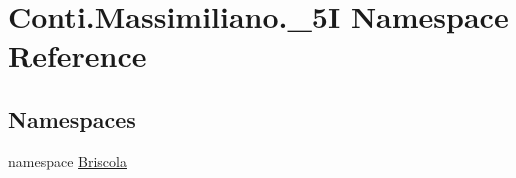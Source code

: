 \hypertarget{namespace_conti_1_1_massimiliano_1_1__5_i}{}\section{Conti.\+Massimiliano.\+\_\+5I Namespace Reference}
\label{namespace_conti_1_1_massimiliano_1_1__5_i}
\subsection*{Namespaces}
\begin{DoxyCompactItemize}
\item 
namespace \hyperlink{namespace_conti_1_1_massimiliano_1_1__5_i_1_1_briscola}{Briscola}
\end{DoxyCompactItemize}
